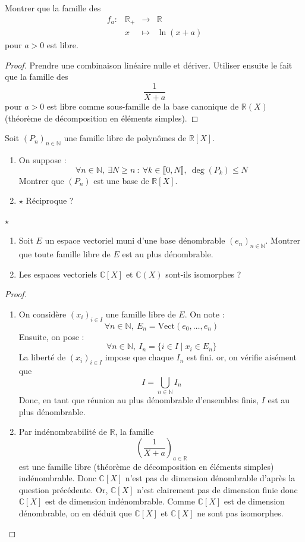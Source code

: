 \documentclass[french,a4paper]{article}
\newcommand{\N}{\mathbb{N}}
\newcommand{\R}{\mathbb{R}}
\newcommand{\C}{\mathbb{C}}
\theoremstyle{plain}
\theoremstyle{definition}
\theoremstyle{remark}
\begin{document}
\begin{ex}[Moulin.12]{}
	Montrer que la famille des $$\begin{array}{lrcl}
		f_a:&\R_+&\longrightarrow&\R \\
		&x&\longmapsto&\ln(x+a)
	\end{array}$$ pour $a>0$ est libre.
\end{ex}
\begin{proof}
	Prendre une combinaison linéaire nulle et dériver. Utiliser ensuite le fait que la famille des $$\frac{1}{X+a}$$ pour $a>0$ est libre comme sous-famille de la base canonique de $\R(X)$ (théorème de décomposition en éléments simples).
\end{proof}

\begin{ex}[Moulin.13]{}
	Soit $(P_n)_{n\in\N}$ une famille libre de polynômes de $\R[X]$.
	\begin{enumerate}
		\item On suppose : $$\forall n\in\N,\ \exists N\geqslant n\ :\ \forall k\in\llbracket0,N\rrbracket,\ \deg(P_k)\leqslant N$$ Montrer que $(P_n)$ est une base de $\R[X]$.
		\item $\star$ Réciproque ?
	\end{enumerate}
\end{ex}

\begin{ex}[Moulin.14]{$\star$}
	\begin{enumerate}
		\item Soit $E$ un espace vectoriel muni d'une base dénombrable $(e_n)_{n\in\N}$. Montrer que toute famille libre de $E$ est au plus dénombrable.
		\item Les espaces vectoriels $\C[X]$ et $\C(X)$ sont-ils isomorphes ?
	\end{enumerate}
\end{ex}
\begin{proof}
	\begin{enumerate}
		\item On considère $(x_i)_{i\in I}$ une famille libre de $E$. On note : $$\forall n\in\N,\ E_n=\text{Vect}(e_0,\ldots,e_n)$$ Ensuite, on pose : $$\forall n\in\N,\ I_n=\{i\in I \mid x_i\in E_n\}$$ La liberté de $(x_i)_{i\in I}$ impose que chaque $I_n$ est fini. or, on vérifie aisément que $$I=\bigcup_{n\in\N} I_n$$ Donc, en tant que réunion au plus dénombrable d'ensembles finis, $I$ est au plus dénombrable.
		\item Par indénombrabilité de $\R$, la famille $$\left(\frac{1}{X+a}\right)_{a\in \R}$$ est une famille libre (théorème de décomposition en éléments simples) indénombrable. Donc $\C[X]$ n'est pas de dimension dénombrable d'après la question précédente. Or, $\C[X]$ n'est clairement pas de dimension finie donc $\C[X]$ est de dimension indénombrable. Comme $\C[X]$ est de dimension dénombrable, on en déduit que $\C[X]$ et $\C[X]$ ne sont pas isomorphes.
	\end{enumerate}
\end{proof}
\end{document}
